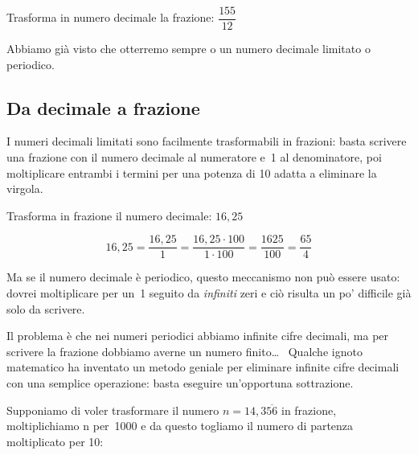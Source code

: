 \begin{esempio}{}{}
Trasforma in numero decimale la frazione: \(\dfrac{155}{12}\)
{\frazdecb}
\end{esempio}

Abbiamo già visto che otterremo sempre o un numero decimale limitato o 
periodico.

\subsection{Da decimale a frazione}

I numeri decimali limitati sono facilmente trasformabili in frazioni: basta 
scrivere una frazione con il numero decimale al numeratore e~1 al 
denominatore, 
poi moltiplicare entrambi i termini per una potenza di 10 adatta a 
eliminare la virgola.

\begin{esempio}{}{}
Trasforma in frazione il numero decimale: \(16,25\)
\begin{center}
 \[16,25 = \frac{16,25}{1} = \frac{16,25 \cdot 100}{1 \cdot 100} =
   \frac{1625}{100} = \frac{65}{4}\]
\end{center}
\end{esempio}

Ma se il numero decimale è periodico, questo meccanismo non può essere 
usato: dovrei moltiplicare per un~1 seguito da \emph{infiniti} zeri e ciò 
risulta un po' difficile già solo da scrivere.

Il problema è che nei numeri periodici abbiamo infinite cifre decimali, ma 
per scrivere la frazione dobbiamo averne un numero finito\dots~ 
Qualche ignoto matematico ha inventato un metodo geniale per eliminare 
infinite cifre decimali con una semplice operazione: basta eseguire 
un'opportuna sottrazione.

Supponiamo di voler trasformare il numero \(n = 14,3\overline{56}\) in 
frazione, moltiplichiamo n per~1000 e da questo togliamo il numero di 
partenza moltiplicato per 10:

{\sottrazioneraz}

